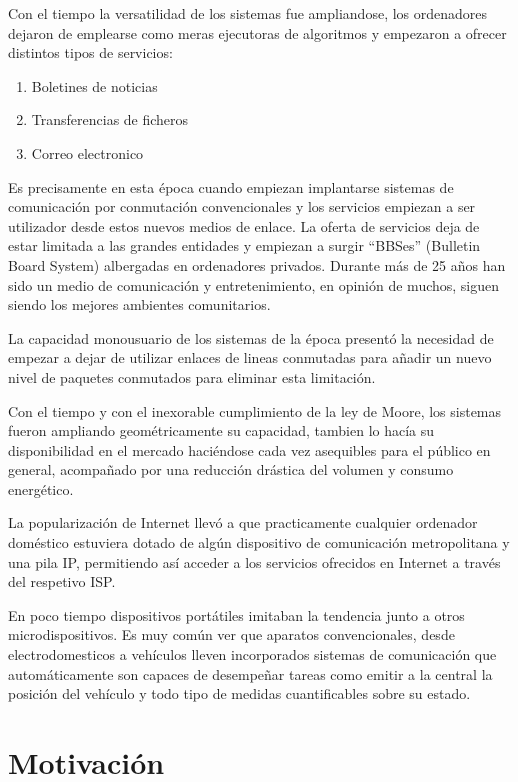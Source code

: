 \documentclass[a4paper,spanish,12pt]{book}
\begin{document}
Con el tiempo la versatilidad de los sistemas fue ampliandose, los ordenadores dejaron de emplearse como meras ejecutoras de algoritmos y empezaron a ofrecer distintos tipos de servicios:
\begin{enumerate}
	\item Boletines de noticias
	\item Transferencias de ficheros
	\item Correo electronico
\end{enumerate}
Es precisamente en esta \'epoca cuando empiezan implantarse sistemas de comunicación por conmutación convencionales y los servicios empiezan a ser utilizador desde estos nuevos medios de enlace. La oferta de servicios deja de estar limitada a las grandes entidades y empiezan a surgir ``BBSes'' (Bulletin Board System) albergadas en ordenadores privados. Durante más de 25 años han sido un medio de comunicación y entretenimiento, en opinión de muchos, siguen siendo los mejores ambientes comunitarios. 

La capacidad monousuario de los sistemas de la \'epoca presentó la necesidad de empezar a dejar de utilizar enlaces de lineas conmutadas para añadir un nuevo nivel de paquetes conmutados para eliminar esta limitación.

Con el tiempo y con el inexorable cumplimiento de la ley de Moore, los sistemas fueron ampliando geom\'etricamente su capacidad, tambien lo hacía su disponibilidad en el mercado haci\'endose cada vez asequibles para el público en general, acompañado por una reducción drástica del volumen y consumo energ\'etico.  

La popularización de Internet llevó a que practicamente cualquier ordenador dom\'estico estuviera dotado de algún dispositivo de comunicación metropolitana y una pila IP, permitiendo así acceder a los servicios ofrecidos en Internet a trav\'es del respetivo ISP. 

En poco tiempo dispositivos portátiles imitaban la tendencia junto a otros microdispositivos. Es muy común ver que aparatos convencionales, desde electrodomesticos a vehículos lleven incorporados sistemas de comunicación que automáticamente son capaces de desempeñar tareas como emitir a la central la posición del vehículo y todo tipo de medidas cuantificables sobre su estado. 

\section{Motivación}
\end{document}
